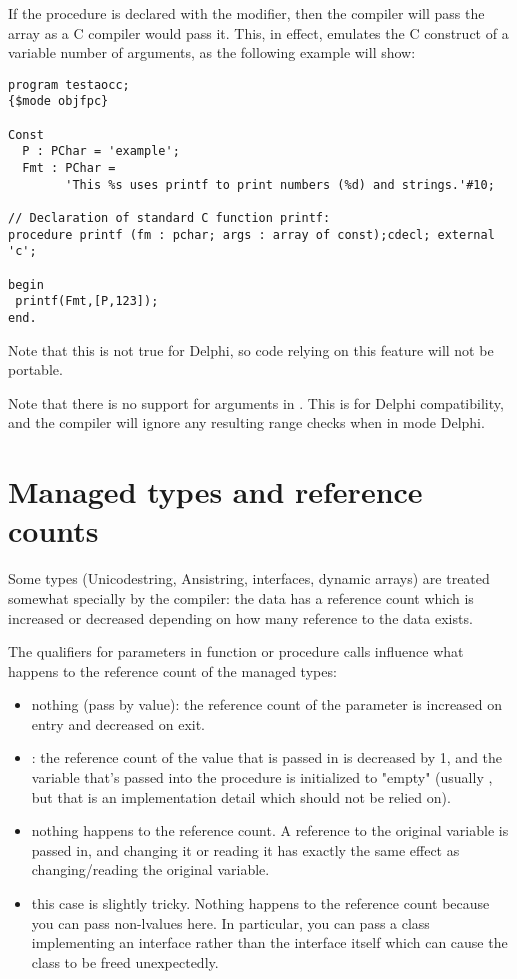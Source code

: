 If the procedure is declared with the  modifier, then the
compiler will pass the array as a C compiler would pass it. This, in effect,
emulates the C construct of a variable number of arguments, as the following
example will show:
\begin{verbatim}
program testaocc;
{$mode objfpc}

Const
  P : PChar = 'example';
  Fmt : PChar =
        'This %s uses printf to print numbers (%d) and strings.'#10;

// Declaration of standard C function printf:
procedure printf (fm : pchar; args : array of const);cdecl; external 'c';

begin
 printf(Fmt,[P,123]);
end.
\end{verbatim}
\begin{remark}
Note that this is not true for Delphi, so code relying on this feature
will not be portable.
\end{remark}

\begin{remark}
Note that there is no support for  arguments in . 
This is for Delphi compatibility, and the compiler will ignore any resulting range checks
when in mode Delphi.
\end{remark}

\section{Managed types and reference counts}
Some types (Unicodestring, Ansistring, interfaces, dynamic arrays) are
treated somewhat specially by the compiler: the data has a reference count
which is increased or decreased depending on how many reference to the data
exists.

The qualifiers for parameters in function or procedure calls influence
what happens to the reference count of the managed types:
\begin{itemize}
\item nothing (pass by value): the reference count of the parameter is increased 
on entry and decreased on exit.
\item {}: the reference count of the value that is passed in is decreased by 1,
 and the variable that's passed into the procedure is initialized to "empty"
(usually , but that is an implementation detail which should not
be relied on).
\item {} nothing happens to the reference count. A reference to the original
 variable is passed in, and changing it or reading it has exactly the same effect as changing/reading the original variable.
\item {} this case is slightly tricky. Nothing happens to the reference
count because you can pass non-lvalues here. 
In particular, you can pass a class implementing an interface rather than the interface itself
which can cause the class to be freed unexpectedly.
\end{itemize}


